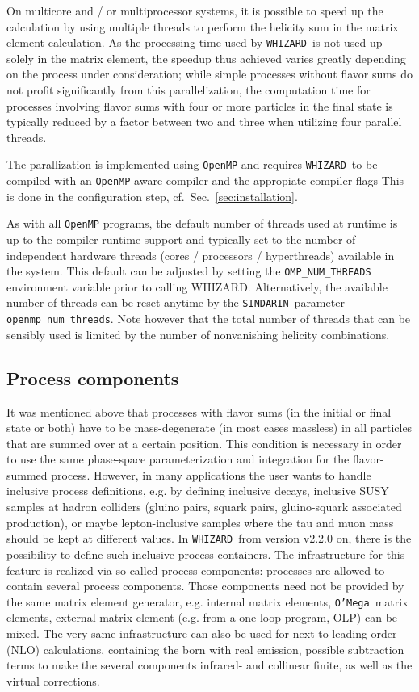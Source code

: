 \documentclass[12pt]{book}
\newcommand{\ttt}[1]{\texttt{#1}}
\newcommand{\whizard}{\ttt{WHIZARD}}
\newcommand{\oMega}{\ttt{O'Mega}}
\newcommand{\sindarin}{\ttt{SINDARIN}}
\begin{document}
On multicore and / or multiprocessor systems, it is possible to speed
up the calculation by using multiple threads to perform the helicity
sum in the matrix element calculation. As the processing time used by
\whizard\ is not used up solely in the matrix element, the speedup thus
achieved varies greatly depending on the process under consideration;
while simple processes without flavor sums do not profit significantly
from this parallelization, the computation time for processes
involving flavor sums with four or more particles in the final state
is typically reduced by a factor between two and three when utilizing
four parallel threads.

The parallization is implemented using \ttt{OpenMP} and requires
\whizard\ to be compiled with an \ttt{OpenMP} aware compiler and the
appropiate compiler flags This is done in the configuration step, cf.\
Sec.~\ref{sec:installation}.

As with all \ttt{OpenMP} programs, the default number of threads used at
runtime is up to the compiler runtime support and typically set to the
number of independent hardware threads (cores / processors /
hyperthreads) available in the system.  This default can be adjusted
by setting the \ttt{OMP\_NUM\_THREADS} environment variable prior to
calling WHIZARD.  Alternatively, the available number of threads can
be reset anytime by the \sindarin\ parameter
\ttt{openmp\_num\_threads}.  Note however that the total number of
threads that can be sensibly used is limited by the number of
nonvanishing helicity combinations.


\subsection{Process components}
\label{sec:processcomp}

It was mentioned above that processes with flavor sums (in the initial
or final state or both) have to be mass-degenerate (in most cases
massless) in all particles that are summed over at a certain
position. This condition is necessary in order to use the same
phase-space parameterization and integration for the flavor-summed
process. However, in many applications the user wants to handle
inclusive process definitions, e.g. by defining inclusive decays,
inclusive SUSY samples at hadron colliders (gluino pairs, squark
pairs, gluino-squark associated production), or maybe lepton-inclusive
samples where the tau and muon mass should be kept at different
values. In \whizard\, from version v2.2.0 on, there is the possibility
to define such inclusive process containers. The infrastructure for
this feature is realized via so-called process components: processes
are allowed to contain several process components. Those components
need not be provided by the same matrix element generator,
e.g. internal matrix elements, \oMega\ matrix elements, external
matrix element (e.g. from a one-loop program, OLP) can be mixed. The
very same infrastructure can also be used for next-to-leading order
(NLO) calculations, containing the born with real emission, possible
subtraction terms to make the several components infrared- and
collinear finite, as well as the virtual corrections.
\end{document}

